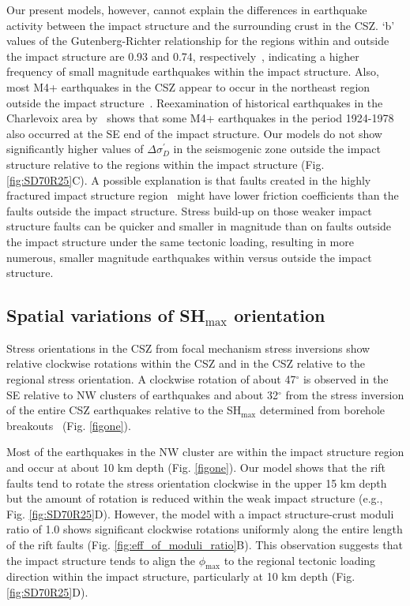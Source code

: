 \documentclass[draft]{agujournal2018}
\begin{document}
Our present models, however, cannot explain the differences in earthquake activity between the impact structure and the surrounding crust in the CSZ. `b' values of the Gutenberg-Richter relationship for the regions within and outside the impact structure are 0.93 and 0.74, respectively~\citep{Yu_2016}, indicating a higher frequency of small magnitude earthquakes within the impact structure. Also, most M4+ earthquakes in the CSZ appear to occur in the northeast region outside the impact structure~\citep[e.g.,][]{lamontagne1999,Powell_2017,Baird_2010}. Reexamination of historical earthquakes in the Charlevoix area by~\citet{Stevens1980} shows that some M4+ earthquakes in the period 1924-1978 also occurred at the SE end of the impact structure. Our models do not show significantly higher values of $\Delta\sigma_{D}^\prime$ in the seismogenic zone outside the impact structure relative to the regions within the impact structure (Fig. \ref{fig:SD70R25}C). A possible explanation is that faults created in the highly fractured impact structure region~\citep{RONDOT_2000} might have lower friction coefficients than the faults outside the impact structure. Stress build-up on those weaker impact structure faults can be quicker and smaller in magnitude than on faults outside the impact structure under the same tectonic loading, resulting in more numerous, smaller magnitude earthquakes within versus outside the impact structure.

\subsection{Spatial variations of SH$_{\max}$ orientation}
Stress orientations in the CSZ from focal mechanism stress inversions \citep{Zoback_1992,Mazzotti_2010} show relative clockwise rotations within the CSZ and in the CSZ relative to the regional stress orientation. A clockwise rotation of about 47$^\circ$ is observed in the SE relative to NW clusters of earthquakes and about 32$^\circ$ from the stress inversion of the entire CSZ earthquakes relative to the SH$_{\max}$ determined from borehole breakouts~\citep{Zoback_1992,Mazzotti_2010} (Fig. \ref{figone}).

Most of the earthquakes in the NW cluster are within the impact structure region and occur at about 10 km depth (Fig. \ref{figone}). Our model shows that the rift faults tend to rotate the stress orientation clockwise in the upper 15 km depth but the amount of rotation is reduced within the weak impact structure (e.g., Fig. \ref{fig:SD70R25}D). However, the model with a impact structure-crust moduli ratio of 1.0 shows significant clockwise rotations uniformly along the entire length of the rift faults (Fig. \ref{fig:eff_of_moduli_ratio}B). This observation suggests that the impact structure tends to align the $\phi_{\max}$ to the regional tectonic loading direction within the impact structure, particularly at 10 km depth (Fig. \ref{fig:SD70R25}D).
\end{document}
